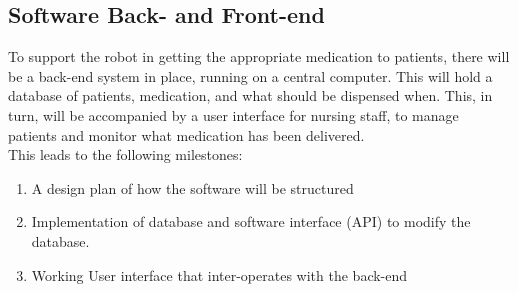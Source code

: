\documentclass[a4paper,10pt,DIV10,openright,openbib]{scrreprt}
\begin{document}
\subsection{Software Back- and Front-end}
To support the robot in getting the appropriate medication to patients, there will
be a back-end system in place, running on a central computer. This will hold a 
database of patients, medication, and what should be dispensed when. This, in
turn, will be accompanied by a user interface for nursing staff, to manage patients
and monitor what medication has been delivered. \\
This leads to the following milestones:
\begin{enumerate}
  \item A design plan of how the software will be structured
  \item Implementation of database and software interface (API) to modify the database.
  \item Working User interface that inter-operates with the back-end
\end{enumerate}


\end{document}
